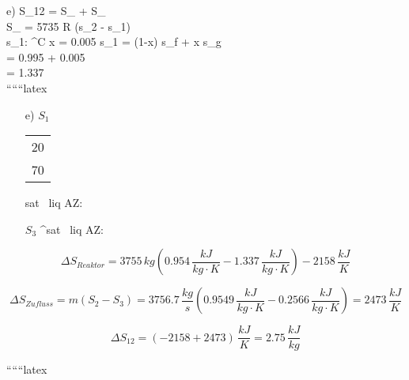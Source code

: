 e) \quad \Delta S_{12} = \Delta S_{} + \Delta S_{} \\

\Delta S_{} = 5735  \cdot \Delta R (s_2 - s_1) \\

s_1: ^\circ C \quad x = 0.005 \quad {} \quad s_1 = (1-x) \cdot s_f + x \cdot s_g \\
\quad = 0.995   + 0.005   \\
\quad = 1.337  \\

``````latex


\begin{itemize}



\item[e)] $S_1$ \quad \begin{tabular}{c} 20 \\ 70 \end{tabular} \quad sat \, liq \quad AZ:  \, 
    \item[] $S_3$ ^\circ \quad sat \, liq \quad AZ:  \, 
\end{itemize}

\[
\Delta S_{Reaktor} = 3755 \, kg \left( 0.954 \, \frac{kJ}{kg \cdot K} - 1.337 \, \frac{kJ}{kg \cdot K} \right) - 2158 \, \frac{kJ}{K}
\]

\[
\Delta S_{Zufluss} = m \left( S_{2} - S_{3} \right) = 3756.7 \, \frac{kg}{s} \left( 0.9549 \, \frac{kJ}{kg \cdot K} - 0.2566 \, \frac{kJ}{kg \cdot K} \right) = 2473 \, \frac{kJ}{K}
\]

\[
\Delta S_{12} = \left( -2158 + 2473 \right) \, \frac{kJ}{K} = 2.75 \, \frac{kJ}{kg}
\]

``````latex
